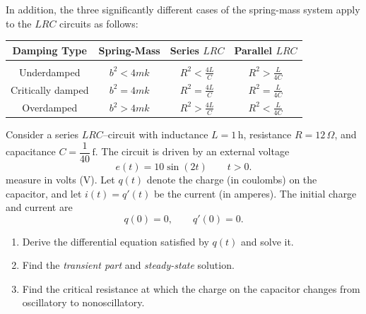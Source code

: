 In addition, the  three significantly different cases of the spring-mass system apply to the \(LRC\)   circuits  as follows:
\begin{center}
	\begin{tabular}{cccc}
		\hline
		Damping Type &  Spring-Mass     & Series \(LRC\)  & Parallel \(LRC\)   \\ 
		\hline\\ [-1ex]
		Underdamped &\(b^2< 4mk\)       &\(\displaystyle R^2<\frac{4L}{C}\)& \(\displaystyle R^2>\frac{L}{4C}\) \\[2ex]
		Critically damped&\(b^2= 4mk\)   &\(\displaystyle R^2=\frac{4L}{C}\)& \(\displaystyle R^2=\frac{L}{4C}\) \\[2ex]
		Overdamped  &\(b^2> 4mk\)      &\(\displaystyle R^2>\frac{4L}{C}\)& \(\displaystyle R^2<\frac{L}{4C}\) \\[2ex]
		\hline
	\end{tabular}
\end{center}

\medskip
\begin{example}
	Consider a series $LRC$–circuit with inductance $L=1\,\text{h}$, resistance 
	$R=12\,\Omega$, and capacitance $C=\dfrac{1}{40}\,\text{f}$. 
	The circuit is driven by an external voltage
	\[
	e(t) = 10\sin(2t) \qquad t>0.
	\] measure in volts (V).
	Let $q(t)$ denote the charge (in coulombs) on the capacitor, and let 
	$i(t)=q'(t)$ be the current (in amperes). The initial charge and current are
	\[
	q(0)=0, \qquad q'(0)=0.
	\]
	\begin{enumerate}[label= (\alph*), noitemsep]
		\item\label{eg-item:LRC-1} Derive the differential equation satisfied by $q(t)$ and solve it.
		\item\label{eg-item:LRC-2} Find the \emph{transient part} and 
		\emph{steady-state} solution.
		\item \label{eg-item:LRC-3} Find the critical resistance at which the charge on the capacitor changes from oscillatory to nonoscillatory.
	\end{enumerate}
\end{example}
	
